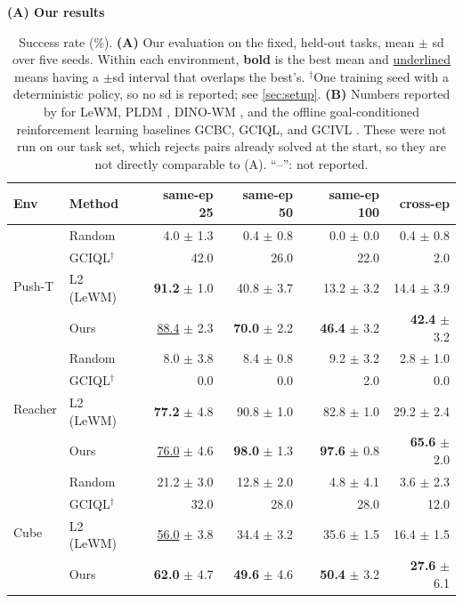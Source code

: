 \documentclass{article} %
\theoremstyle{definition}
\theoremstyle{remark}
\begin{document}
\begin{table}[t]
\centering\small
\caption{Success rate (\%). \textbf{(A)} Our evaluation on the fixed, held-out tasks, mean $\pm$ sd over five
seeds. Within each environment, \textbf{bold} is the best mean and \underline{underlined} means having a $\pm$sd interval that overlaps the best's. $^{\dagger}$One training seed with a deterministic policy, so no sd is reported; see \cref{sec:setup}. \textbf{(B)} Numbers reported by \citet{lewm} for LeWM, PLDM \citep{pldm}, DINO-WM \citep{dinowm}, and the offline goal-conditioned reinforcement learning baselines GCBC, GCIQL, and GCIVL \citep{ogbench}. These were not run on our task set, which rejects pairs already solved at the start, so they are not directly comparable to (A). ``--'': not reported.}
\label{tab:main}
\textbf{(A) Our results}\par\smallskip
\begin{tabular}{llrrrr}
\toprule
Env & Method & same-ep 25 & same-ep 50 & same-ep 100 & cross-ep \\
\midrule
\multirow{4}{*}{Push-T} & Random & 4.0 $\pm$ 1.3 & 0.4 $\pm$ 0.8 & 0.0 $\pm$ 0.0 & 0.4 $\pm$ 0.8 \\
 & GCIQL$^{\dagger}$ & 42.0 & 26.0 & 22.0 & 2.0 \\
 & L2 (LeWM) & \textbf{91.2} $\pm$ 1.0 & 40.8 $\pm$ 3.7 & 13.2 $\pm$ 3.2 & 14.4 $\pm$ 3.9 \\
 & Ours & \underline{88.4} $\pm$ 2.3 & \textbf{70.0} $\pm$ 2.2 & \textbf{46.4} $\pm$ 3.2 & \textbf{42.4} $\pm$ 3.2 \\
\midrule
\multirow{4}{*}{Reacher} & Random & 8.0 $\pm$ 3.8 & 8.4 $\pm$ 0.8 & 9.2 $\pm$ 3.2 & 2.8 $\pm$ 1.0 \\
 & GCIQL$^{\dagger}$ & 0.0 & 0.0 & 2.0 & 0.0 \\
 & L2 (LeWM) & \textbf{77.2} $\pm$ 4.8 & 90.8 $\pm$ 1.0 & 82.8 $\pm$ 1.0 & 29.2 $\pm$ 2.4 \\
 & Ours & \underline{76.0} $\pm$ 4.6 & \textbf{98.0} $\pm$ 1.3 & \textbf{97.6} $\pm$ 0.8 & \textbf{65.6} $\pm$ 2.0 \\
\midrule
\multirow{4}{*}{Cube} & Random & 21.2 $\pm$ 3.0 & 12.8 $\pm$ 2.0 & 4.8 $\pm$ 4.1 & 3.6 $\pm$ 2.3 \\
 & GCIQL$^{\dagger}$ & 32.0 & 28.0 & 28.0 & 12.0 \\
 & L2 (LeWM) & \underline{56.0} $\pm$ 3.8 & 34.4 $\pm$ 3.2 & 35.6 $\pm$ 1.5 & 16.4 $\pm$ 1.5 \\
 & Ours & \textbf{62.0} $\pm$ 4.7 & \textbf{49.6} $\pm$ 4.6 & \textbf{50.4} $\pm$ 3.2 & \textbf{27.6} $\pm$ 6.1 \\
\bottomrule
\end{tabular}


\end{table}
\end{document}
